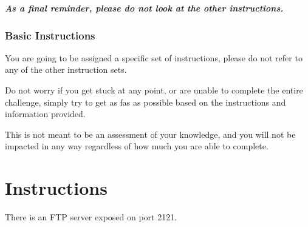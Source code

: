 {{{                    \textbf{\textit{As a final reminder, please do not look at the other instructions.}}



            }



\newpage



\label{subsec:CTFs-gb}














    \label{subsubsec:CTFs-gb-instructions}







        \subsubsection{Basic Instructions}



            {\parindent0pt\singlespacing



                You are going to be assigned a specific set of instructions, please do not refer to any of the other instruction sets.



                Do not worry if you get stuck at any point, or are unable to complete the entire challenge, simply try to get as fas as possible based on the instructions and information provided. %



This is not meant to be an assessment of your knowledge, and you will not be impacted in any way regardless of how much you are able to complete. 







                \section*{Instructions}



                    There is an FTP server exposed on port 2121. %



}}}
